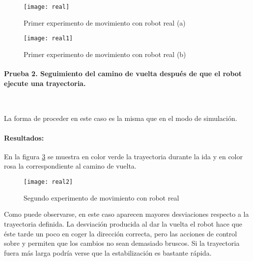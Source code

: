 \begin{figure}[h]
  \centering\texttt{[image: real]}
  \caption{Primer experimento de movimiento con robot real (a)}\label{fg:real1a}
\end{figure}

\begin{figure}[h]
  \centering\texttt{[image: real1]}
  \caption{Primer experimento de movimiento con robot real (b)}\label{fg:real1b}
\end{figure}

\clearpage
\paragraph{Prueba 2. Seguimiento del camino de vuelta después de que el robot ejecute una trayectoria.}\ %

\noindent
La forma de proceder en este caso es la misma que en el modo de simulación.

\paragraph{Resultados:}
En la figura \ref{fg:real2} se muestra en color verde la trayectoria durante la ida y en color rosa la correspondiente al camino de vuelta.

\begin{figure}[h]
  \centering\texttt{[image: real2]}\\
  \caption{Segundo experimento de movimiento con robot real}\label{fg:real2}
\end{figure}

Como puede observarse, en este caso aparecen mayores desviaciones respecto a la trayectoria definida. La desviación producida al dar la vuelta el robot hace que éste tarde un poco en coger la dirección correcta, pero las acciones de control sobre  y  permiten que los cambios no sean demasiado bruscos. Si la trayectoria fuera más larga podría verse que la estabilización es bastante rápida.
